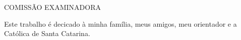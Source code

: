 
\inserecapa

\inserefolhaderosto


\inserecatalog  


\begin{folhadeaprovacao}

  \begin{center}
    {\chapterfont \MakeUppercase{\bfseries \insereautor}}

    \vfill
    \begin{center}
      {\chapterfont \MakeUppercase{\bfseries\inseretitulo \inseresubtitulo}}
    \end{center}
    \vfill
    
    \hspace{.45\textwidth}
    \begin{minipage}{.5\textwidth}
        \inserenatureza
        \\ \\
        \begin{center}COMISSÃO EXAMINADORA \end{center}
    \end{minipage}%
    \vfill
   \end{center}
           

\end{folhadeaprovacao}




\begin{agradecimentos}

Este trabalho é decicado à minha família, meus amigos, meu orientador e a Católica de Santa Catarina. 

\end{agradecimentos}

